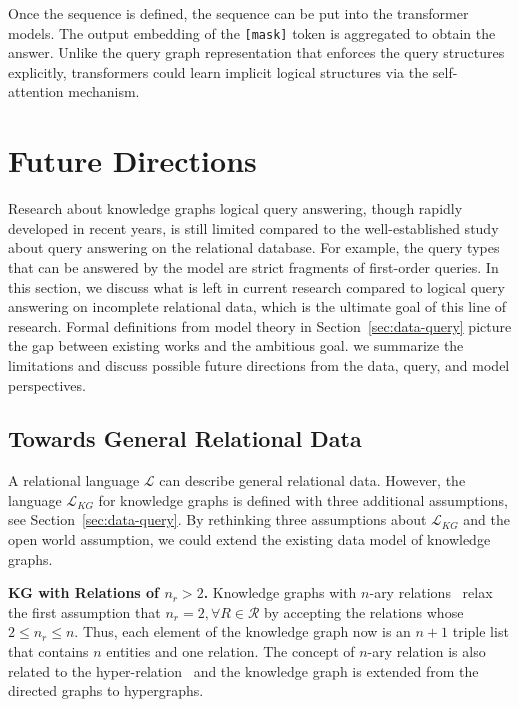 \documentclass[11pt]{article}
\newcommand{\relation}{\mathcal{R}}
\newcommand{\lang}{\mathcal{L}}
\begin{document}
Once the sequence is defined, the sequence can be put into the transformer models. The output embedding of the \texttt{[mask]} token is aggregated to obtain the answer. Unlike the query graph representation that enforces the query structures explicitly, transformers could learn implicit logical structures via the self-attention mechanism.

\section{Future Directions}\label{sec:future}
Research about knowledge graphs logical query answering, though rapidly developed in recent years, is still limited compared to the well-established study about query answering on the relational database. For example, the query types that can be answered by the model are strict fragments of first-order queries.
In this section, we discuss what is left in current research compared to logical query answering on incomplete relational data, which is the ultimate goal of this line of research. Formal definitions from model theory in Section~\ref{sec:data-query} picture the gap between existing works and the ambitious goal. we summarize the limitations and discuss possible future directions from the data, query, and model perspectives.

\subsection{Towards General Relational Data}
A relational language $\lang$ can describe general relational data. However, the language $\lang_{KG}$ for knowledge graphs is defined with three additional assumptions, see Section~\ref{sec:data-query}. By rethinking three assumptions about $\lang_{KG}$ and the open world assumption, we could extend the existing data model of knowledge graphs.

\noindent\textbf{KG with Relations of $n_r > 2$.} Knowledge graphs with $n$-ary relations~\cite{Zhang2022FactTreeReasoning} relax the first assumption that $n_r=2, \forall R\in \relation$ by accepting the relations whose $2\leq n_r \leq n$. Thus, each element of the knowledge graph now is an $n+1$ triple list that contains $n$ entities and one relation. The concept of $n$-ary relation is also related to the hyper-relation~\cite{Galkin2020MessagePassing,Alivanistos2022QueryEmbedding} and the knowledge graph is extended from the directed graphs to hypergraphs.
\end{document}
